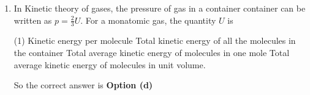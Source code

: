 \begin{enumerate}
 \begin{tasks}(4)
	\task[\textbf{a.}] $\frac{1}{2} k T$
	\task[\textbf{b.}]$\frac{3}{2} k T$
	\task[\textbf{c.}]$\frac{5}{2} k T$
	\task[\textbf{d.}]  $\frac{7}{2} k T$
\end{tasks}
\begin{answer}
	$$
	\begin{aligned}
	&\text { The degree of freedom } n=7\\
	&\text { According to law of equipartition of energy }\\
	E&=7 \times \frac{1}{2} k T=\frac{7}{2} k T
\end{aligned}
$$
	So the corrext answer is \textbf{Option (d)}
\end{answer}
\item In Kinetic theory of gases, the pressure of gas in a container container can be written as $p=\frac{2}{3} U$. For a monatomic gas, the quantity $U$ is
 \begin{tasks}(1)
	\task[\textbf{a.}]Kinetic energy per molecule
	\task[\textbf{b.}]Total kinetic energy of all the molecules in the container
	\task[\textbf{c.}]Total average kinetic energy of molecules in one mole
	\task[\textbf{d.}] Total average kinetic energy of molecules in unit volume.
\end{tasks}
\begin{answer}
		So the correct answer is \textbf{Option (d)}
\end{answer}
\end{enumerate}